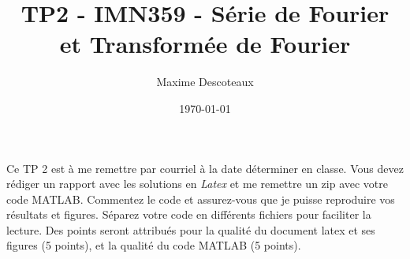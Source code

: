 \documentclass{article}
\title{TP2 - IMN359 - Série de Fourier et Transformée de Fourier}
\author{Maxime Descoteaux}
\date{\today}
\begin{document}
\maketitle

Ce TP 2 est à me remettre par courriel à la date déterminer en classe.
Vous devez rédiger un rapport avec les solutions en 
\emph{Latex} et me remettre un zip avec votre code MATLAB. Commentez
le code et assurez-vous que je puisse reproduire vos 
résultats et figures. 
Séparez votre code en différents fichiers pour faciliter la
lecture. Des points seront attribués pour la qualité du document latex
et ses figures (5 points), et la qualité du code MATLAB (5 points). 

\section*{}
\end{document}
